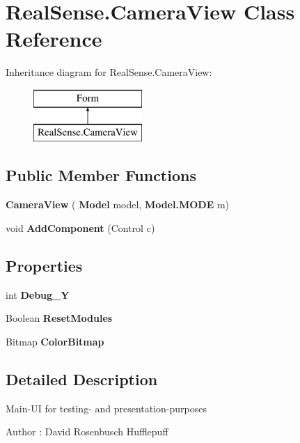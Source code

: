 \section{Real\+Sense.\+Camera\+View Class Reference}
\label{class_real_sense_1_1_camera_view}
Inheritance diagram for Real\+Sense.\+Camera\+View\+:\begin{figure}[H]
\begin{center}
\leavevmode
\includegraphics[height=2.000000cm]{class_real_sense_1_1_camera_view}
\end{center}
\end{figure}
\subsection*{Public Member Functions}
\begin{DoxyCompactItemize}
\item 
\textbf{ Camera\+View} (\textbf{ Model} model, \textbf{ Model.\+M\+O\+DE} m)
\item 
void \textbf{ Add\+Component} (Control c)
\end{DoxyCompactItemize}
\subsection*{Properties}
\begin{DoxyCompactItemize}
\item 
int \textbf{ Debug\+\_\+Y}\hspace{0.3cm}{\ttfamily  [get, set]}
\item 
Boolean \textbf{ Reset\+Modules}\hspace{0.3cm}{\ttfamily  [set]}
\item 
Bitmap \textbf{ Color\+Bitmap}\hspace{0.3cm}{\ttfamily  [get]}
\end{DoxyCompactItemize}


\subsection{Detailed Description}
Main-\/\+UI for testing-\/ and presentation-\/purposes \begin{DoxyAuthor}{Author}
\+: David Rosenbusch  Hufflepuff 
\end{DoxyAuthor}


